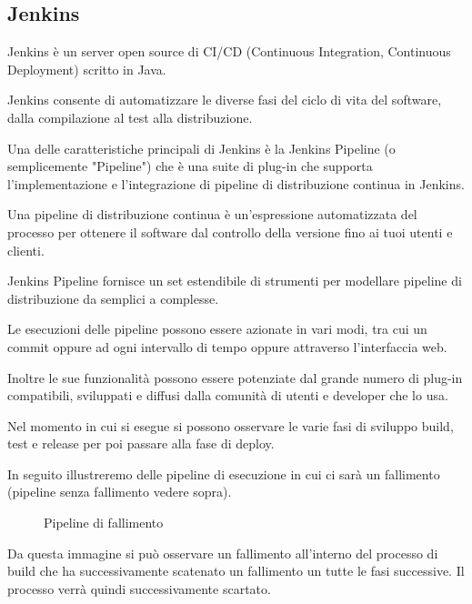 \subsection{Jenkins}
\cite{Jenkins}
Jenkins è un server open source di CI/CD (Continuous Integration, Continuous Deployment) scritto in Java. 

Jenkins consente di automatizzare le diverse fasi del ciclo di vita del software, dalla compilazione al test alla distribuzione.

Una delle caratteristiche principali di Jenkins è la Jenkins Pipeline (o semplicemente "Pipeline") che è una suite di plug-in che supporta l'implementazione e l'integrazione di pipeline di distribuzione continua in Jenkins.

Una pipeline di distribuzione continua è un'espressione automatizzata del processo per ottenere il software dal controllo della versione fino ai tuoi utenti e clienti.

Jenkins Pipeline fornisce un set estendibile di strumenti per modellare pipeline di distribuzione da semplici a complesse. 

Le esecuzioni delle pipeline possono essere azionate in vari modi, tra cui un commit oppure ad ogni intervallo di tempo oppure attraverso l'interfaccia web. 

Inoltre le sue funzionalità possono essere potenziate dal grande numero di plug-in compatibili, sviluppati e diffusi dalla comunità di utenti e developer che lo usa.

Nel momento in cui si esegue si possono osservare le varie fasi di sviluppo build, test e release per poi passare alla fase di deploy. 

In seguito illustreremo delle pipeline di esecuzione in cui ci sarà un fallimento (pipeline senza fallimento vedere sopra). 
\begin{figure}[H]
    \caption{Pipeline di fallimento}
    \label{fig:pipelineIns}
\end{figure}
Da questa immagine si può osservare un fallimento all’interno del processo di build che ha successivamente scatenato un fallimento un tutte le fasi successive. Il processo verrà quindi successivamente scartato.
